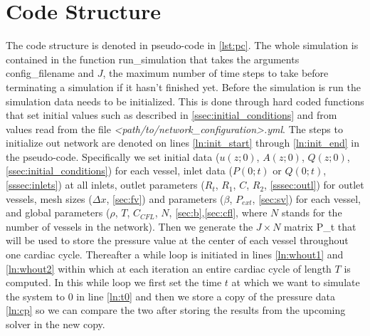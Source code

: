 \documentclass[a4paper, oneside]{discothesis}
\begin{document}
							\section{Code Structure} \label{sec:cs}
							The code structure is denoted in pseudo-code in \autoref{lst:pc}.
							The whole simulation is contained in the function run\_simulation that takes the arguments config\_filename and $J$, the maximum number of time steps to take before terminating a simulation if it hasn't finished yet.
							Before the simulation is run the simulation data needs to be initialized.
							This is done through hard coded functions that set initial values such as described in \autoref{ssec:initial_conditions} and from values read from the file \emph{<path/to/network\_configuration>.yml}.
							The steps to initialize out network are denoted on lines \ref{ln:init_start} through \ref{ln:init_end} in the pseudo-code.
							Specifically we set initial data ($u(z;0)$, $A(z;0)$, $Q(z;0)$, \autoref{ssec:initial_conditions}) for each vessel, inlet data ($P(0;t)$ or $Q(0;t)$, \autoref{sssec:inlets}) at all inlets, outlet parameters ($R_t$, $R_1$, $C$, $R_2$, \autoref{sssec:outl}) for outlet vessels, mesh sizes ($\Delta x$, \autoref{sec:fv}) and parameters ($\beta$, $P_{ext}$, \autoref{sec:sv}) for each vessel, and global parameters ($\rho$, $T$, $C_{CFL}$, $N$, \autoref{sec:b},\autoref{sec:cfl}, where $N$ stands for the number of vessels in the network).
							Then we generate the $J \times N$ matrix P\_t that will be used to store the pressure value at the center of each vessel throughout one cardiac cycle.
							Thereafter a while loop is initiated in lines \ref{ln:whout1} and \ref{ln:whout2} within which at each iteration an entire cardiac cycle of length $T$ is computed.
							In this while loop we first set the time $t$ at which we want to simulate the system to $0$ in line \ref{ln:t0} and then we store a copy of the pressure data \ref{ln:cp} so we can compare the two after storing the results from the upcoming solver in the new copy.
\end{document}
